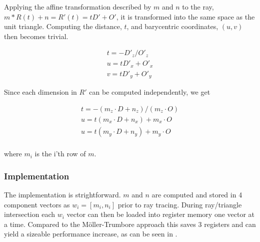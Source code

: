

Applying the affine transformation described by $m$ and $n$ to the
ray, $m * R(t) + n = R'(t) = tD' + O'$, it is transformed into the
same space as the unit triangle. Computing the distance, $t$, and
barycentric coordinates, $(u,v)$ then becomes trivial.

\begin{displaymath}
  \begin{array}{l}
    t = - D'_z / O'_z \\
    u = t D'_x + O'_x \\
    v = t D'_y + O'_y
  \end{array}
\end{displaymath}

Since each dimension in $R'$ can be computed independently, we get 

\begin{displaymath}
  \begin{array}{l}
    t = - (m_z \cdot D + n_z) / (m_z \cdot O) \\
    u = t (m_x \cdot D + n_x) + m_x \cdot O \\
    u = t (m_y \cdot D + n_y) + m_y \cdot O \\
  \end{array}
\end{displaymath}

where $m_i$ is the i'th row of $m$.

\subsubsection{Implementation}

The implementation is strightforward. $m$ and $n$ are computed and
stored in 4 component vectors as $w_i = \left[m_i, n_i \right]$ prior
to ray tracing. During ray/triangle intersection each $w_i$ vector can
then be loaded into register memory one vector at a time. Compared to
the Möller-Trumbore approach this saves 3 registers and can yield a
sizeable performance increase, as can be seen in . 

